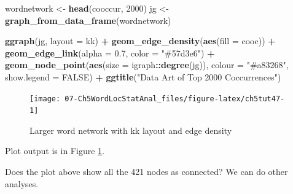 \documentclass[
]{article}
\newenvironment{Shaded}{\begin{snugshade}}{\end{snugshade}}
\newcommand{\AttributeTok}[1]{\textcolor[rgb]{0.13,0.29,0.53}{#1}}
\newcommand{\CommentTok}[1]{\textcolor[rgb]{0.56,0.35,0.01}{\textit{#1}}}
\newcommand{\ConstantTok}[1]{\textcolor[rgb]{0.56,0.35,0.01}{#1}}
\newcommand{\DecValTok}[1]{\textcolor[rgb]{0.00,0.00,0.81}{#1}}
\newcommand{\FloatTok}[1]{\textcolor[rgb]{0.00,0.00,0.81}{#1}}
\newcommand{\FunctionTok}[1]{\textcolor[rgb]{0.13,0.29,0.53}{\textbf{#1}}}
\newcommand{\NormalTok}[1]{#1}
\newcommand{\OtherTok}[1]{\textcolor[rgb]{0.56,0.35,0.01}{#1}}
\newcommand{\SpecialCharTok}[1]{\textcolor[rgb]{0.81,0.36,0.00}{\textbf{#1}}}
\newcommand{\StringTok}[1]{\textcolor[rgb]{0.31,0.60,0.02}{#1}}
\begin{document}
\begin{Shaded}
\begin{Highlighting}[]
\NormalTok{wordnetwork }\OtherTok{\textless{}{-}} \FunctionTok{head}\NormalTok{(cooccur, }\DecValTok{2000}\NormalTok{)}
\NormalTok{jg }\OtherTok{\textless{}{-}} \FunctionTok{graph\_from\_data\_frame}\NormalTok{(wordnetwork)}

\FunctionTok{ggraph}\NormalTok{(jg, }\AttributeTok{layout =} \StringTok{\textquotesingle{}kk\textquotesingle{}}\NormalTok{) }\SpecialCharTok{+} 
      \FunctionTok{geom\_edge\_density}\NormalTok{(}\FunctionTok{aes}\NormalTok{(}\AttributeTok{fill =}\NormalTok{ cooc)) }\SpecialCharTok{+} 
      \FunctionTok{geom\_edge\_link}\NormalTok{(}\AttributeTok{alpha =} \FloatTok{0.7}\NormalTok{, }\AttributeTok{color =} \StringTok{"\#57d3e6"}\NormalTok{) }\SpecialCharTok{+}
      \FunctionTok{geom\_node\_point}\NormalTok{(}\FunctionTok{aes}\NormalTok{(}\AttributeTok{size =}\NormalTok{ igraph}\SpecialCharTok{::}\FunctionTok{degree}\NormalTok{(jg)), }
                      \AttributeTok{colour =} \StringTok{"\#a83268"}\NormalTok{, }\AttributeTok{show.legend =} \ConstantTok{FALSE}\NormalTok{) }\SpecialCharTok{+}
      \FunctionTok{ggtitle}\NormalTok{(}\StringTok{"Data Art of Top 2000 Coccurrences"}\NormalTok{)}
\end{Highlighting}
\end{Shaded}

\begin{figure}

{\centering \texttt{[image: 07-Ch5WordLocStatAnal\_files/figure-latex/ch5tut47-1]} 

}

\caption{Larger word network with kk layout and edge density}\label{fig:ch5tut47}
\end{figure}

Plot output is in Figure \ref{fig:ch5tut47}.

Does the plot above show all the 421 nodes as connected? We can do other analyses.

\begin{Shaded}
\end{Shaded}
\end{document}
